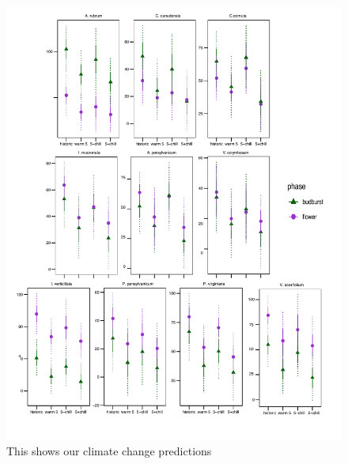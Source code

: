 \documentclass[11pt]{article}
\begin{document}
    \begin{figure}[h!]
    \centering
 \includegraphics[width=\textwidth]{..//Plots/Flobuds_manuscript_figs/climpredictions.pdf}
    \caption{This shows our climate change predictions }
    \label{fig:preddy}
\end{figure}
\end{document}
